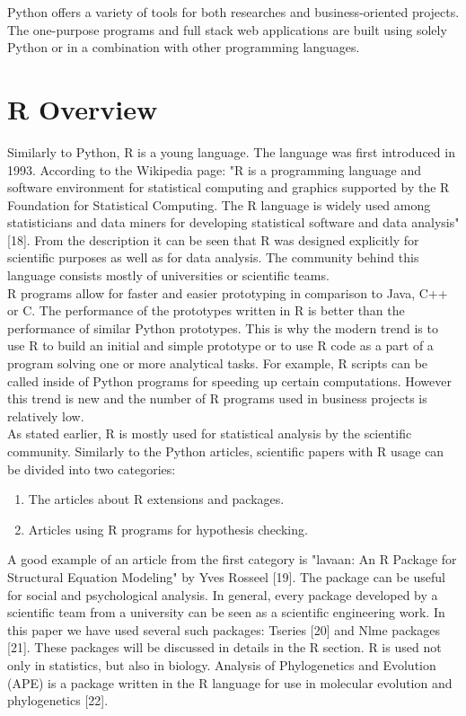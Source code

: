 \documentclass[
  twoside,
  11pt, a4paper,
  footinclude=true,
  headinclude=true,
  cleardoublepage=empty
]{scrreprt}
\begin{document}
        Python offers a variety of tools for both researches and business-oriented projects. The one-purpose programs and full stack web applications are built using solely Python or in a combination with other programming languages. 
        
        \section{R Overview}
        Similarly to Python, R is a young language. The language was first introduced in 1993. According to the Wikipedia page: "R is a programming language and software environment for statistical computing and graphics supported by the R Foundation for Statistical Computing. The R language is widely used among statisticians and data miners for developing statistical software and data analysis" [18]. From the description it can be seen that R was designed explicitly for scientific purposes as well as for data analysis. The community behind this language consists mostly of universities or scientific teams. \\
        R programs allow for faster and easier prototyping in comparison to Java, C++ or C. The performance of the prototypes written in R is better than the performance of similar Python prototypes. This is why the modern trend is to use R to build an initial and simple prototype or to use R code as a part of a program solving one or more analytical tasks. For example, R scripts can be called inside of Python programs for speeding up certain computations. However this trend is new and the number of R programs used in business projects is relatively low.\\
        As stated earlier, R is mostly used for statistical analysis by the scientific community. Similarly to the Python articles, scientific papers with R usage can be divided into two categories:
        \begin{enumerate}
            \item The articles about R extensions and packages.
            \item Articles using R programs for hypothesis checking.
        \end{enumerate}
        A good example of an article from the first category is "lavaan: An R Package for Structural Equation Modeling" by Yves Rosseel [19]. The package can be useful for social and psychological analysis. In general, every package developed by a scientific team from a university can be seen as a scientific engineering work. In this paper we have used several such packages: Tseries [20] and Nlme packages [21]. These packages will be discussed in details in the R section. R is used not only in statistics, but also in biology. Analysis of Phylogenetics and Evolution (APE) is a package written in the R language for use in molecular evolution and phylogenetics [22].
\end{document}
